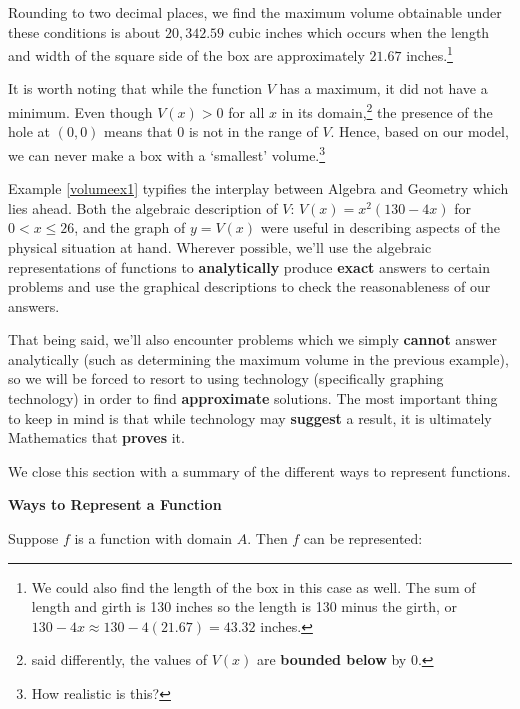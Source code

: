 \documentclass{ximera}
\begin{document}
\begin{example}
\begin{enumerate}
Rounding to two decimal places, we find the maximum volume obtainable under these conditions is about $20, \! 342.59$ cubic inches which occurs when the length and width of the square side of the box are approximately $21.67$ inches.\footnote{We could also find the length of the box in this case as well.  The sum of length and girth is 130 inches so the length is 130 minus the girth, or $130 - 4x \approx 130 - 4(21.67) = 43.32$ inches.}  



 

It is worth noting that while the function $V$ has a maximum, it did not have a minimum.  Even though $V(x)>0$ for all $x$ in its domain,\footnote{said differently, the values of $V(x)$ are \textbf{bounded below} by $0$.} the presence of the hole at $(0,0)$ means that $0$ is not in the range of $V$.  Hence, based on our model, we can never make a box with a  `smallest' volume.\footnote{How realistic is this?}   

\end{enumerate}
\end{example}

 

Example \ref{volumeex1} typifies the interplay between Algebra and Geometry which lies ahead.  Both the algebraic description of  $V$: $V(x) = x^2 (130 - 4x)$ for $0 < x \leq 26$, and the graph of $y=V(x)$ were useful in describing aspects of the physical situation at hand.  Wherever possible, we'll use the algebraic representations of functions to \textbf{analytically} produce \textbf{exact} answers to certain problems and use the graphical descriptions to check the reasonableness of our answers. 

That being said, we'll also encounter problems which we simply \textbf{cannot} answer analytically (such as determining the maximum volume in the previous example), so we will be forced to resort to using technology (specifically graphing technology) in order to find \textbf{approximate} solutions.  The most important thing to keep in mind is that while technology may \textbf{suggest} a result, it is ultimately Mathematics that \textbf{proves} it. 

We close this section with a summary of the different ways to represent functions.

  


\centerline{\textbf{Ways to Represent a Function}} \label{waystorepresentfunctionsbox}

 

Suppose $f$ is a function with domain $A$.  Then $f$ can be represented:
\end{document}
